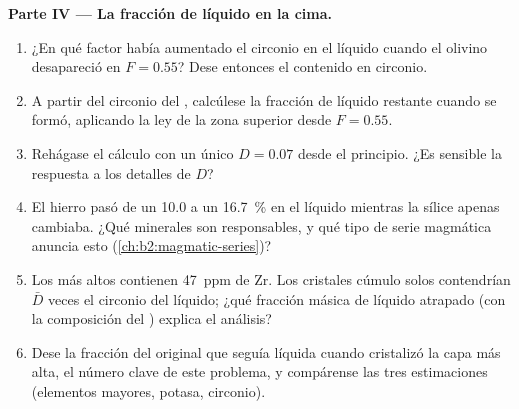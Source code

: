\begin{problem}
\noindent\textbf{Parte IV --- La fracción de líquido en la cima.}
\begin{enumerate}[resume]
\item ¿En qué factor había aumentado el circonio en el líquido cuando el olivino desapareció en
$F = 0.55$? Dese entonces el contenido en circonio.
\item A partir del circonio del , calcúlese la fracción de líquido restante cuando
se formó, aplicando la ley de la zona superior desde $F = 0.55$.
\item Rehágase el cálculo con un único $D = 0.07$ desde el principio. ¿Es sensible la respuesta
a los detalles de $D$?
\item El hierro pasó de un 10.0 a un \qty{16.7}{\percent} en el líquido mientras la sílice apenas
cambiaba. ¿Qué minerales son responsables, y qué tipo de serie magmática
anuncia esto (\cref{ch:b2:magmatic-series})?
\item Los  más altos contienen \qty{47}{ppm} de Zr. Los cristales cúmulo solos contendrían
$\bar D$ veces el circonio del líquido; ¿qué fracción másica de líquido atrapado
(con la composición del ) explica el análisis?
\item Dese la fracción del  original que seguía líquida cuando cristalizó la capa más
alta, el número clave de este problema, y compárense las tres estimaciones
(elementos mayores, potasa, circonio).
\end{enumerate}
\end{problem}
